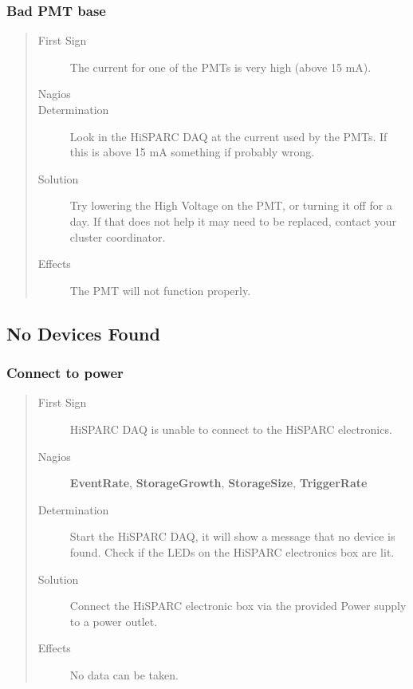 \documentclass[a4paper,11pt,english]{sphinxmanual}
\begin{document}
\subsubsection{Bad PMT base}
\label{known-issues:bad-pmt-base}\begin{quote}\begin{description}
\item[{First Sign}] \leavevmode
The current for one of the PMTs is very high (above 15 mA).

\item[{Nagios}] \leavevmode
\item[{Determination}] \leavevmode
Look in the HiSPARC DAQ at the current used by the
PMTs. If this is above 15 mA something if probably wrong.

\item[{Solution}] \leavevmode
Try lowering the High Voltage on the PMT, or turning it off
for a day. If that does not help it may need to be replaced,
contact your cluster coordinator.

\item[{Effects}] \leavevmode
The PMT will not function properly.

\end{description}\end{quote}


\subsection{No Devices Found}
\label{known-issues:no-devices-found}

\subsubsection{Connect to power}
\label{known-issues:connect-to-power}\begin{quote}\begin{description}
\item[{First Sign}] \leavevmode
HiSPARC DAQ is unable to connect to the HiSPARC
electronics.

\item[{Nagios}] \leavevmode
\textbf{EventRate}, \textbf{StorageGrowth}, \textbf{StorageSize},
\textbf{TriggerRate}

\item[{Determination}] \leavevmode
Start the HiSPARC DAQ, it will show a message that no
device is found. Check if the LEDs on the HiSPARC
electronics box are lit.

\item[{Solution}] \leavevmode
Connect the HiSPARC electronic box via the provided Power
supply to a power outlet.

\item[{Effects}] \leavevmode
No data can be taken.

\end{description}\end{quote}



\renewcommand{\indexname}{Index}
\printindex
\end{document}
